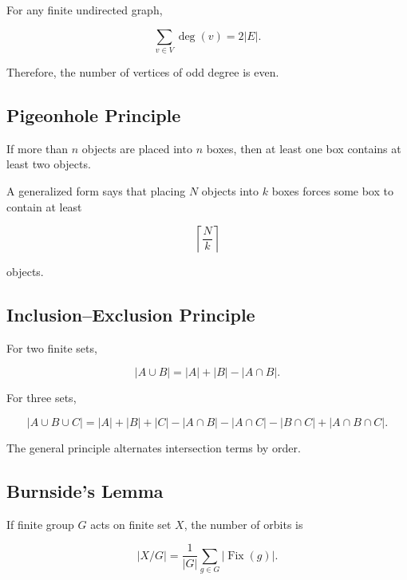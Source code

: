 For any finite undirected graph,

\[
\boxed{
\sum_{v\in V}
\deg(v)
=
2|E|.
}
\]

Therefore, the number of vertices of odd degree is even.

\subsection{Pigeonhole Principle}
\label{subsec:pigeonhole-principle-summary}

If more than \(n\) objects are placed into \(n\) boxes, then at least one box
contains at least two objects.

A generalized form says that placing \(N\) objects into \(k\) boxes forces
some box to contain at least

\[
\boxed{
\left\lceil
\frac{N}{k}
\right\rceil
}
\]

objects.

\subsection{Inclusion--Exclusion Principle}
\label{subsec:inclusion-exclusion-summary}

For two finite sets,

\[
\boxed{
|A\cup B|
=
|A|+|B|-|A\cap B|.
}
\]

For three sets,

\[
\boxed{
|A\cup B\cup C|
=
|A|+|B|+|C|
-
|A\cap B|
-
|A\cap C|
-
|B\cap C|
+
|A\cap B\cap C|.
}
\]

The general principle alternates intersection terms by order.

\subsection{Burnside's Lemma}
\label{subsec:burnside-lemma-summary}

If finite group \(G\) acts on finite set \(X\), the number of orbits is

\[
\boxed{
|X/G|
=
\frac1{|G|}
\sum_{g\in G}
|\operatorname{Fix}(g)|.
}
\]

